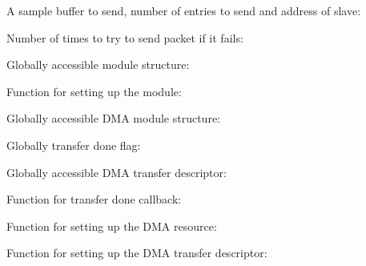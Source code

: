 \begin{DoxyItemize}
\item A sample buffer to send, number of entries to send and address of slave\+: 
\begin{DoxyCodeInclude}{0}
\end{DoxyCodeInclude}
 Number of times to try to send packet if it fails\+: 
\begin{DoxyCodeInclude}{0}
\end{DoxyCodeInclude}

\item Globally accessible module structure\+: 
\begin{DoxyCodeInclude}{0}
\end{DoxyCodeInclude}

\item Function for setting up the module\+: 
\begin{DoxyCodeInclude}{0}
\end{DoxyCodeInclude}

\item Globally accessible D\+MA module structure\+: 
\begin{DoxyCodeInclude}{0}
\end{DoxyCodeInclude}

\item Globally transfer done flag\+: 
\begin{DoxyCodeInclude}{0}
\end{DoxyCodeInclude}

\item Globally accessible D\+MA transfer descriptor\+: 
\begin{DoxyCodeInclude}{0}
\end{DoxyCodeInclude}

\item Function for transfer done callback\+: 
\begin{DoxyCodeInclude}{0}
\end{DoxyCodeInclude}

\item Function for setting up the D\+MA resource\+: 
\begin{DoxyCodeInclude}{0}
\end{DoxyCodeInclude}

\item Function for setting up the D\+MA transfer descriptor\+: 
\begin{DoxyCodeInclude}{0}
\end{DoxyCodeInclude}


\end{DoxyItemize}
